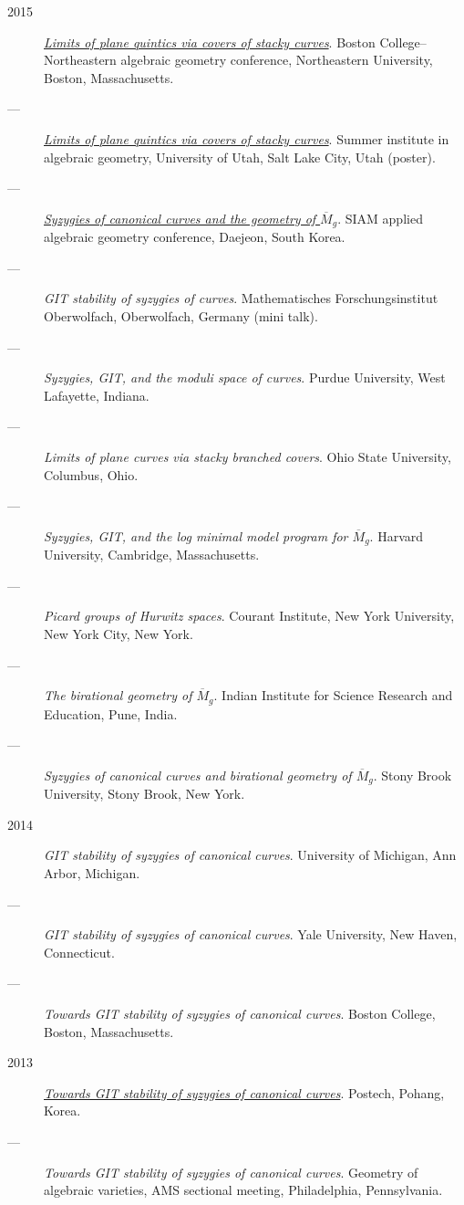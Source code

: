 \documentclass[11pt]{article}
\begin{document}
\begin{description}
\item[{2015}] \emph{\href{talks/AGNUBS2015.pdf}{Limits of plane quintics via covers of stacky curves}}. Boston College--Northeastern algebraic geometry conference, Northeastern University, Boston, Massachusetts.
\item[{---}] \emph{\href{talks/quintics\_poster.pdf}{Limits of plane quintics via covers of stacky curves}}. Summer institute in algebraic geometry, University of Utah, Salt Lake City, Utah (poster).
\item[{---}] \emph{\href{talks/SIAM2015.pdf}{Syzygies of canonical curves and the geometry of \(\overline M_g\)}}. SIAM applied algebraic geometry conference, Daejeon, South Korea.
\item[{---}] \emph{GIT stability of syzygies of curves}. Mathematisches Forschungsinstitut Oberwolfach, Oberwolfach, Germany (mini talk).
\item[{---}] \emph{Syzygies, GIT, and the moduli space of curves}. Purdue University, West Lafayette, Indiana.
\item[{---}] \emph{Limits of plane curves via stacky branched covers}. Ohio State University, Columbus, Ohio.
\item[{---}] \emph{Syzygies, GIT, and the log minimal model program for \(\overline{M}_g\)}. Harvard University, Cambridge, Massachusetts.
\item[{---}] \emph{Picard groups of Hurwitz spaces}. Courant Institute, New York University, New York City, New York.
\item[{---}] \emph{The birational geometry of \(\overline M_g\)}. Indian Institute for Science Research and Education, Pune, India.
\item[{---}] \emph{Syzygies of canonical curves and birational geometry of \(\overline M_g\)}. Stony Brook University, Stony Brook, New York.
\item[{2014}] \emph{GIT stability of syzygies of canonical curves}. University of Michigan, Ann Arbor, Michigan.
\item[{---}] \emph{GIT stability of syzygies of canonical curves}. Yale University, New Haven, Connecticut.
\item[{---}] \emph{Towards GIT stability of syzygies of canonical curves}. Boston College, Boston, Massachusetts.
\item[{2013}] \emph{\href{talks/syz2013.pdf}{Towards GIT stability of syzygies of canonical curves}}. Postech, Pohang, Korea.
\item[{---}] \emph{Towards GIT stability of syzygies of canonical curves}. Geometry of algebraic varieties, AMS sectional meeting, Philadelphia, Pennsylvania.

\end{description}
\end{document}

